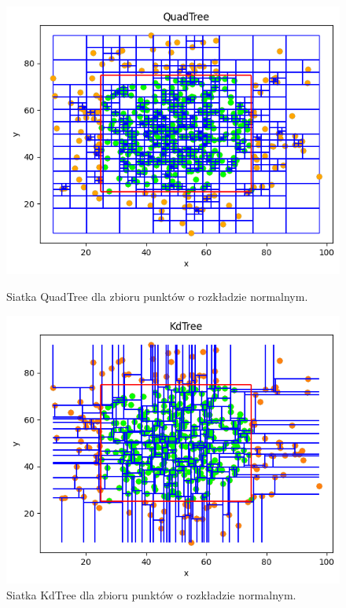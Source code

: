 \documentclass{lab}
\begin{document}
\begin{figure}[H]
  \centering
  \begin{minipage}{0.495\textwidth}
      \centering
      \includegraphics[width=1\textwidth]{resources/normal_QuadTree.png}
      \caption{Siatka QuadTree dla zbioru punktów o rozkładzie normalnym.}
      \label{fig:normal_QuadTree}
  \end{minipage}
  \begin{minipage}{0.495\textwidth}
      \centering
      \includegraphics[width=1\textwidth]{resources/normal_KdTree.png}
      \caption{Siatka KdTree dla zbioru punktów o rozkładzie normalnym.}
      \label{fig:normal_KdTree}
  \end{minipage}
\end{figure}
\end{document}
